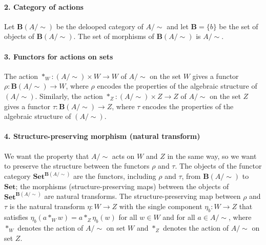 \paragraph{2. Category of actions}
Let $\textbf{B}(A/\sim)$ be the delooped category of $A/\sim$ and let $\textbf{B} = \{b\}$ be the set of objects of $\textbf{B}(A/\sim)$.
The set of morphisms of $\textbf{B}(A/\sim)$ is $A/\sim$.

\paragraph{3. Functors for actions on sets}
The action $*_{W}: (A/\sim) \times W \to W$ of $A/\sim$ on the set $W$ gives a functor $\rho: \textbf{B}(A/\sim) \to W$, where $\rho$ encodes the properties of the algebraic structure of $(A/\sim)$.
Similarly, the action $*_{Z}: (A/\sim) \times Z \to Z$ of $A/\sim$ on the set $Z$ gives a functor $\tau: \textbf{B}(A/\sim) \to Z$, where $\tau$ encodes the properties of the algebraic structure of $(A/\sim)$.

\paragraph{4. Structure-preserving morphism (natural transform)}
We want the property that $A/\sim$ acts on $W$ and $Z$ in the same way, so we want to preserve the structure between the functors $\rho$ and $\tau$.
The objects of the functor category $\textbf{Set}^{\textbf{B}(A/\sim)}$ are the functors, including $\rho$ and $\tau$, from $\textbf{B}(A/\sim)$ to $\textbf{Set}$; the morphisms (structure-preserving maps) between the objects of $\textbf{Set}^{\textbf{B}(A/\sim)}$ are natural transforms.
The structure-preserving map between $\rho$ and $\tau$ is the natural transform $\eta: W \to Z$ with the single component $\eta_{b}: W \to Z$ that satisfies $\eta_{b}(a *_{W} w) = a *_{Z} \eta_{b}(w)$ for all $w \in W$ and for all $a \in A/\sim$, where $*_{W}$ denotes the action of $A/\sim$ on set $W$ and $*_{Z}$ denotes the action of $A/\sim$ on set $Z$.

